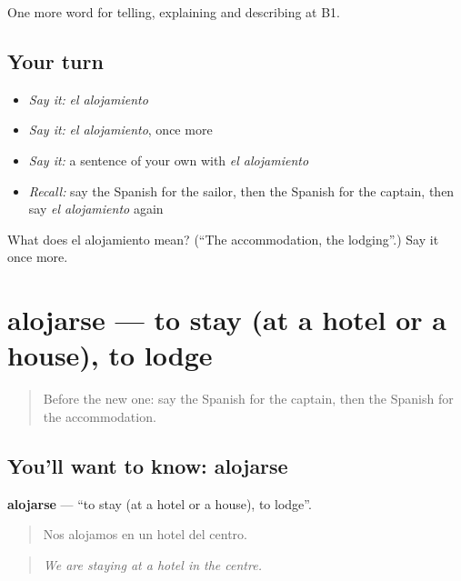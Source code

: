 \begin{grammarlens}[title={What you've built}]
One more word for telling, explaining and describing at B1.
\end{grammarlens}

\subsection*{Your turn}
\begin{itemize}
\raggedright
  \item \emph{Say it:} \emph{el alojamiento}
  \item \emph{Say it:} \emph{el alojamiento}, once more
  \item \emph{Say it:} a sentence of your own with \emph{el alojamiento}
  \item \emph{Recall:} say the Spanish for the sailor, then the Spanish for the captain, then say \emph{el alojamiento} again
\end{itemize}

\begin{tcolorbox}[breakable,colback=teal!4,colframe=teal!35!black,title={Before you move on}]
What does el alojamiento mean? (\textquotedblleft{}The accommodation, the lodging\textquotedblright{}.) Say it once more.
\end{tcolorbox}
\section[alojarse]{alojarse — to stay (at a hotel or a house), to lodge}

\label{lesson:ES-C660-alojarse}



\begin{quote}
Before the new one: say the Spanish for the captain, then the Spanish for the accommodation.
\end{quote}

\subsection*{You'll want to know: alojarse}
\textbf{alojarse} — \textquotedblleft{}to stay (at a hotel or a house), to lodge\textquotedblright{}.

\begin{quote}
Nos alojamos en un hotel del centro.
\end{quote}

\begin{quote}
\emph{We are staying at a hotel in the centre.}
\end{quote}

